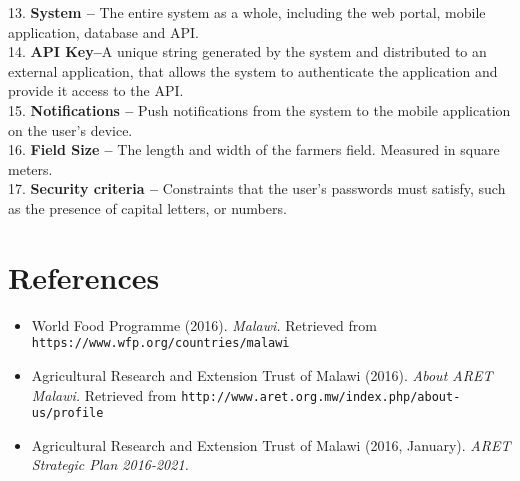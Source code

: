 \documentclass[12pt,letterpaper]{article}
\begin{document}
13. \textbf{System --} The entire system as a whole, including the web portal, mobile application, database and API.\\
14. \textbf{API Key--}A unique string generated by the system and distributed to an external application, that allows the system to authenticate the application and provide it access to the API.\\
15. \textbf{Notifications --} Push notifications from the system to the mobile application on the user's device.\\
16. \textbf{Field Size --} The length and width of the farmers field. Measured in square meters. \\
17. \textbf{Security criteria --} Constraints that the user's passwords must satisfy, such as the presence of capital letters, or numbers.




\clearpage
\section{References}
\begin{flushleft}
\begin{itemize}[leftmargin=12pt]

\item World Food Programme (2016). \emph{Malawi.}
 Retrieved from \texttt{https://www.wfp.org/countries/malawi}

\item Agricultural Research and Extension Trust of Malawi (2016). \emph{About ARET Malawi.}
Retrieved from \texttt{http://www.aret.org.mw/index.php/about-us/profile}

\item Agricultural Research and Extension Trust of Malawi (2016, January). \emph{ARET Strategic Plan 2016-2021.}


\end{itemize}
\end{flushleft}   
\end{document}
